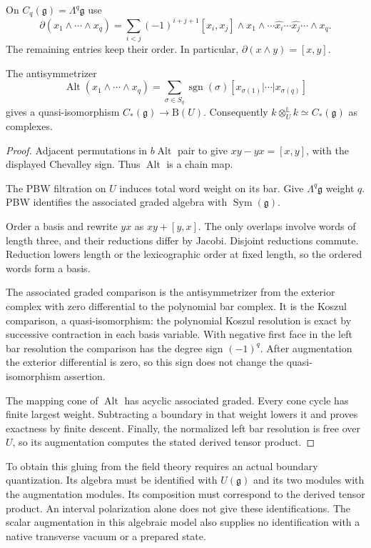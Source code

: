 On $C_q(\mathfrak g)=\Lambda^q\mathfrak g$ use
\[
 \partial(x_1\wedge\cdots\wedge x_q)
 =\sum_{i<j}(-1)^{i+j+1}[x_i,x_j]\wedge
 x_1\wedge\cdots\widehat{x_i}\cdots\widehat{x_j}\cdots\wedge x_q .
\]
The remaining entries keep their order.  In particular,
$\partial(x\wedge y)=[x,y]$.

\begin{proposition}\label{cbc:bv:augmentation}
The antisymmetrizer
\[
 \operatorname{Alt}(x_1\wedge\cdots\wedge x_q)
 =\sum_{\sigma\in S_q}\operatorname{sgn}(\sigma)
       [x_{\sigma(1)}|\cdots|x_{\sigma(q)}]
\]
gives a quasi-isomorphism
$C_*(\mathfrak g)\to\mathrm B(U)$.
Consequently $k\otimes_U^{\mathbb L}k\simeq C_*(\mathfrak g)$
as complexes.
\end{proposition}
\begin{proof}
Adjacent permutations in $b\operatorname{Alt}$ pair to give
$xy-yx=[x,y]$, with the displayed Chevalley sign.
Thus $\operatorname{Alt}$ is a chain map.

The PBW filtration on $U$ induces total word weight on its bar.
Give $\Lambda^q\mathfrak g$ weight $q$.
PBW identifies the associated graded algebra with
$\operatorname{Sym}(\mathfrak g)$.

Order a basis and rewrite $yx$ as $xy+[y,x]$.
The only overlaps involve words of length three, and their reductions
differ by Jacobi.  Disjoint reductions commute.
Reduction lowers length or the lexicographic order at fixed length,
so the ordered words form a basis.

The associated graded comparison is the antisymmetrizer from the
exterior complex with zero differential to the polynomial bar
complex.  It is the Koszul comparison, a quasi-isomorphism: the
polynomial Koszul resolution is exact by successive contraction in
each basis variable.  With negative first face in the left bar
resolution the comparison has the degree sign $(-1)^q$.
After augmentation the exterior differential is zero, so this sign
does not change the quasi-isomorphism assertion.

The mapping cone of $\operatorname{Alt}$ has acyclic associated
graded.  Every cone cycle has finite largest weight.  Subtracting a
boundary in that weight lowers it and proves exactness by finite
descent.  Finally, the normalized left bar resolution is free over
$U$, so its augmentation computes the stated derived tensor product.
\end{proof}

To obtain this gluing from the field theory requires an actual
boundary quantization.  Its algebra must be identified with
$U(\mathfrak g)$ and its two modules with the augmentation modules.
Its composition must correspond to the derived tensor product.
An interval polarization alone
does not give these identifications.
The scalar augmentation in this algebraic model also supplies no
identification with a native transverse vacuum or a prepared state.

